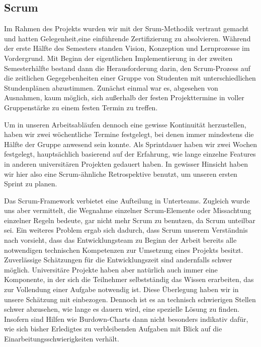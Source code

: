 \subsection{Scrum}
	Im Rahmen des Projekts wurden wir mit der Srum-Methodik vertraut gemacht und hatten Gelegenheit,eine einführende Zertifizierung zu absolvieren. Während der erste Hälfte des Semesters standen Vision, Konzeption und Lernprozesse im Vordergrund. Mit Beginn der eigentlichen Implementierung in der zweiten Semesterhälfte bestand dann die Herausforderung darin, den Scrum-Prozess auf die zeitlichen Gegegebenheiten einer Gruppe von Studenten mit unterschiedlichen Stundenplänen abzustimmen. Zunächst einmal war es, abgesehen von Ausnahmen, kaum möglich, sich außerhalb der festen Projekttermine in voller Gruppenstärke zu einem festen Termin zu treffen. 
    
	Um in unseren Arbeitsabläufen dennoch eine gewisse Kontinuität herzustellen, haben wir zwei wöchentliche Termine festgelegt, bei denen immer mindestens die Hälfte der Gruppe anwesend sein konnte. Als Sprintdauer haben wir zwei Wochen festgelegt, hauptsächlich basierend auf der Erfahrung, wie lange einzelne Features in anderen universitären Projekten gedauert haben. In gewisser Hinsicht haben wir hier also eine Scrum-ähnliche Retrospektive benutzt, um unseren ersten Sprint zu planen.
    
	Das Scrum-Framework verbietet eine Aufteilung in Unterteams. Zugleich wurde uns aber vermittelt, die Wegnahme einzelner Scrum-Elemente oder Missachtung einzelner Regeln bedeute, gar nicht mehr Scrum zu benutzen, da Scrum unteilbar sei. Ein weiteres Problem ergab sich dadurch, dass Scrum unserem Verständnis nach vorsieht, dass das Entwicklungsteam zu Beginn der Arbeit bereits alle notwendigen technischen Kompetenzen zur Umsetzung eines Projekts besitzt. Zuverlässige Schätzungen für die Entwicklungszeit sind andernfalls schwer möglich. Universitäre Projekte haben aber natürlich auch immer eine Komponente, in der sich die Teilnehmer selbstständig das Wissen erarbeiten, das zur Vollendung einer Aufgabe notwendig ist. Diese Überlegung haben wir in unsere Schätzung mit einbezogen. Dennoch ist es an technisch schwierigen Stellen schwer abzusehen, wie lange es dauern wird, eine spezielle Lösung zu finden. Insofern sind Hilfen wie Burdown-Charts dann nicht besonders indikativ dafür, wie sich bisher Erledigtes zu verbleibenden Aufgaben mit Blick auf die Einarbeitungsschwierigkeiten verhält.
